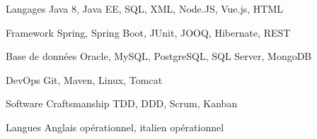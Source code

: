 

\begin{cvskills}

  \cvskill
    {Langages} %
    {Java 8, Java EE, SQL, XML, Node.JS, Vue.js, HTML} %

  \cvskill
    {Framework} %
    {Spring, Spring Boot, JUnit, JOOQ, Hibernate, REST} %

  \cvskill
    {Base de données} %
    {Oracle, MySQL, PostgreSQL, SQL Server, MongoDB} %


  \cvskill
    {DevOps} %
    {Git, Maven, Linux, Tomcat} %

  \cvskill
    {Software Craftsmanship} %
    {TDD, DDD, Scrum, Kanban} %

  \cvskill
    {Langues} %
    {Anglais opérationnel, italien opérationnel} %

\end{cvskills}